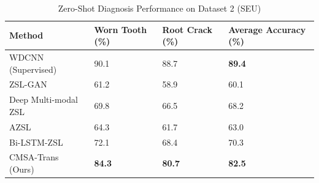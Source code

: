 \begin{table}[htbp]
\centering
\caption{Zero-Shot Diagnosis Performance on Dataset 2 (SEU)}
\label{tab:seu_results}
\begin{tabular}{p{3.5cm}p{2.5cm}p{2.5cm}p{3cm}}
\toprule
\textbf{Method} & \textbf{Worn Tooth (\%)} & \textbf{Root Crack (\%)} & \textbf{Average Accuracy (\%)} \\
\midrule
WDCNN (Supervised) & 90.1 & 88.7 & \textbf{89.4} \\
\midrule
ZSL-GAN & 61.2 & 58.9 & 60.1 \\
\midrule
Deep Multi-modal ZSL & 69.8 & 66.5 & 68.2 \\
\midrule
AZSL & 64.3 & 61.7 & 63.0 \\
\midrule
Bi-LSTM-ZSL & 72.1 & 68.4 & 70.3 \\
\midrule
CMSA-Trans (Ours) & \textbf{84.3} & \textbf{80.7} & \textbf{82.5} \\
\bottomrule
\end{tabular}
\end{table}
